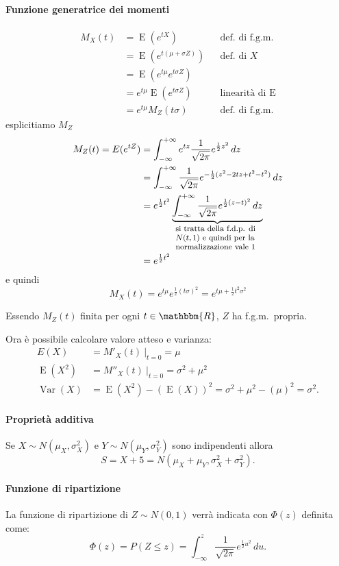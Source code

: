\documentclass[11pt,a4paper,twoside]{article}
\let\leq\leqslant%
\newcommand\R{\mathbbm{R}}
\newcommand\du{\,du}
\newcommand\dz{\,dz}
\newcommand{\computedat}[1]{\:\bigg\rvert_{#1}}
\newcommand{\explain}[2]{\underbrace{#1}_{\parbox{\widthof{\ensuremath{#1}}}{\footnotesize\raggedright #2}}}
\DeclareMathOperator{\Var}{Var}
\DeclareMathOperator{\E}{E}
\begin{document}
\paragraph{Funzione generatrice dei momenti}
\begin{align*}
  M_X(t)
  &= \E(e^{tX}) &&\mbox{def. di f.g.m.} \\
  &= \E\left( e^{t(\mu + \sigma Z)} \right) &&\mbox{def. di } X\\
  &= \E( e^{t\mu} e^{t\sigma Z} ) \\
  &= e^{t\mu} \E(e^{t \sigma Z}) &&\mbox{linearità di } \E \\
  &= e^{t\mu} M_Z(t\sigma) &&\mbox{def. di f.g.m.}
\end{align*}
esplicitiamo \(M_Z\)
\begin{align*}
  M_Z(t) = E(e^{tZ})
  &= \int_{-\infty}^{+\infty} e^{tz} \frac{1}{\sqrt{2 \pi}} e^{\frac{1}{2}z^2} \dz \\
  &= \int_{-\infty}^{+\infty} \frac{1}{\sqrt{2 \pi}}
    e^{-\frac{1}{2}(z^2 -2tz + t^2 - t^2)} \dz \\
  &= e^{\frac{1}{2}t^2}
    \explain{ \int_{-\infty}^{+\infty} \frac{1}{\sqrt{2\pi}} e^{\frac{1}{2}(z-t)^2} \dz}
    {si tratta della f.d.p. di \(N(t, 1)\) e quindi per la normalizzazione vale 1} \\
  &= e^{\frac{1}{2}t^2}
\end{align*}
e quindi
\[
  M_X(t) = e^{t\mu} e^{\frac{1}{2}(t\sigma)^2} = e^{t\mu + \frac{1}{2}t^2\sigma^2}
\]

Essendo \(M_Z(t)\) finita per ogni \(t\in\R\), \(Z\) ha f.g.m.\ propria.

Ora è possibile calcolare valore atteso e varianza:
\begin{align*}
  E(X) &= M'_X(t)\computedat{t=0} = \mu \\
  \E(X^2) &= M''_X(t)\computedat{t=0} = \sigma^2 + \mu^2 \\
  \Var(X) &= \E(X^2) - \left( \E(X) \right)^2 = \sigma^2 + \mu^2 - (\mu)^2 = \sigma^2.
\end{align*}

\paragraph{Proprietà additiva}
Se \(X \sim N(\mu_X, \sigma^2_X)\) e \(Y \sim N(\mu_Y, \sigma^2_Y)\)
sono indipendenti allora
\[
  S = X + 5 = N(\mu_X + \mu_Y, \sigma^2_X + \sigma^2_Y) .
\]

\paragraph{Funzione di ripartizione}
La funzione di ripartizione di \(Z \sim N(0, 1)\) verrà indicata con
\(\Phi(z)\) definita come:
\[
  \Phi(z) = P(Z \leq z) = \int_{-\infty}^z \frac{1}{\sqrt{2\pi}} e^{\frac{1}{2}u^2} \du.
\]
\end{document}
